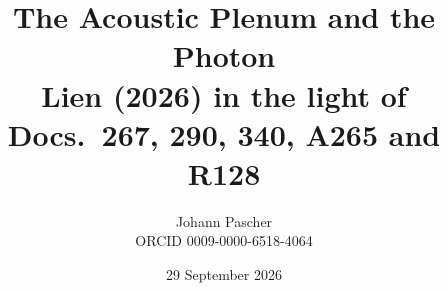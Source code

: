 \documentclass[11pt,a4paper]{report}
\title{The Acoustic Plenum and the Photon\\[0.5em]
  \large Lien (2026) in the light of Docs.~267, 290, 340, A265 and R128}
\date{29 September 2026}
\author{Johann Pascher\\\small ORCID 0009-0000-6518-4064}
\begin{document}
\renewcommand{\thechapter}{}
\renewcommand{\thesection}{\arabic{section}}
\maketitle
\tableofcontents

\end{document}
